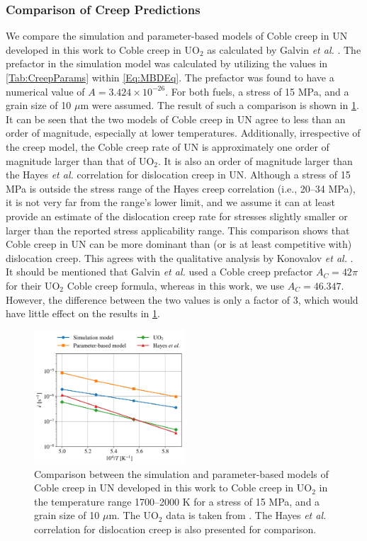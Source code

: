 \documentclass[preprint,12pt,sort&compress]{elsarticle}
\newcommand{\?}{\stackrel{?}{=}}
\begin{document}
\subsubsection{Comparison of Creep Predictions}

We compare the simulation and parameter-based models of Coble creep in UN developed in this work to Coble creep in UO$_2$ as calculated by Galvin \textit{et al.} \cite{Galvin2025}. The prefactor in the simulation model was calculated by utilizing the values in \cref{Tab:CreepParams} within \cref{Eq:MBDEq}. The prefactor was found to have a numerical value of $A = 3.424 \times 10^{-26}$. For both fuels, a stress of 15 MPa, and a grain size of 10 $\mu$m were assumed. The result of such a comparison is shown in \cref{Fig:UNvsUO2}. It can be seen that the two models of Coble creep in UN agree to less than an order of magnitude, especially at lower temperatures. Additionally, irrespective of the creep model, the Coble creep rate of UN is approximately one order of magnitude larger than that of UO$_2$. It is also an order of magnitude larger than the Hayes \textit{et al.} correlation for dislocation creep in UN. Although a stress of 15 MPa is outside the stress range of the Hayes creep correlation (i.e., 20--34 MPa), it is not very far from the range's lower limit, and we assume it can at least provide an estimate of the dislocation creep rate for stresses slightly smaller or larger than the reported stress applicability range. This comparison shows that Coble creep in UN can be more dominant than (or is at least competitive with) dislocation creep. This agrees with the qualitative analysis by Konovalov \textit{et al.} \cite{Konovalov2016}. It should be mentioned that Galvin \textit{et al.} \cite{Galvin2025} used a Coble creep prefactor $A_C = 42 \pi$ for their UO$_2$ Coble creep formula, whereas in this work, we use $A_C = 46.347$. However, the difference between the two values is only a factor of 3, which would have little effect on the results in \cref{Fig:UNvsUO2}.

\begin{figure}[h!]
    \centering
    \includegraphics[width=0.5\textwidth]{UNvsUO2.png}
    \caption{Comparison between the simulation and parameter-based models of Coble creep in UN developed in this work to Coble creep in UO$_2$ in the temperature range 1700--2000 K for a stress of 15 MPa, and a grain size of 10 $\mu$m. The UO$_2$ data is taken from \cite{Galvin2025}. The Hayes \textit{et al.} \cite{Hayes1990II} correlation for dislocation creep is also presented for comparison.}
    \label{Fig:UNvsUO2}
\end{figure}
\end{document}
